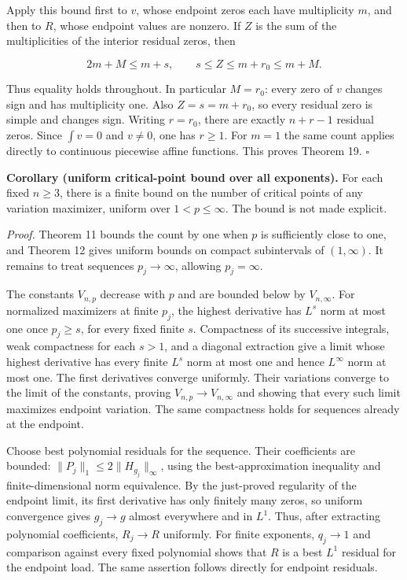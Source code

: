 \documentclass[11pt]{article}
\begin{document}
Apply this bound first to \(v\), whose endpoint zeros each have
multiplicity \(m\), and then to \(R\), whose endpoint values are
nonzero. If \(Z\) is the sum of the multiplicities of the interior
residual zeros, then

\[
2m+M\le m+s,\qquad
s\le Z\le m+r_0\le m+M.
\tag{18.8}
\]

Thus equality holds throughout. In particular \(M=r_0\): every zero of
\(v\) changes sign and has multiplicity one. Also \(Z=s=m+r_0\), so
every residual zero is simple and changes sign. Writing \(r=r_0\), there
are exactly \(n+r-1\) residual zeros. Since \(\int v=0\) and \(v\ne0\),
one has \(r\ge1\). For \(m=1\) the same count applies directly to
continuous piecewise affine functions. This proves Theorem 19.
\(\square\)

\textbf{Corollary (uniform critical-point bound over all exponents).}
For each fixed \(n\ge3\), there is a finite bound on the number of
critical points of any variation maximizer, uniform over
\(1<p\le\infty\). The bound is not made explicit.

\emph{Proof.} Theorem 11 bounds the count by one when \(p\) is
sufficiently close to one, and Theorem 12 gives uniform bounds on
compact subintervals of \((1,\infty)\). It remains to treat sequences
\(p_j\to\infty\), allowing \(p_j=\infty\).

The constants \(V_{n,p}\) decrease with \(p\) and are bounded below by
\(V_{n,\infty}\). For normalized maximizers at finite \(p_j\), the
highest derivative has \(L^s\) norm at most one once \(p_j\ge s\), for
every fixed finite \(s\). Compactness of its successive integrals, weak
compactness for each \(s>1\), and a diagonal extraction give a limit
whose highest derivative has every finite \(L^s\) norm at most one and
hence \(L^\infty\) norm at most one. The first derivatives converge
uniformly. Their variations converge to the limit of the constants,
proving \(V_{n,p}\to V_{n,\infty}\) and showing that every such limit
maximizes endpoint variation. The same compactness holds for sequences
already at the endpoint.

Choose best polynomial residuals for the sequence. Their coefficients
are bounded: \(\|P_j\|_1\le2\|H_{g_j}\|_\infty\), using the
best-approximation inequality and finite-dimensional norm equivalence.
By the just-proved regularity of the endpoint limit, its first
derivative has only finitely many zeros, so uniform convergence gives
\(g_j\to g\) almost everywhere and in \(L^1\). Thus, after extracting
polynomial coefficients, \(R_j\to R\) uniformly. For finite exponents,
\(q_j\to1\) and comparison against every fixed polynomial shows that
\(R\) is a best \(L^1\) residual for the endpoint load. The same
assertion follows directly for endpoint residuals.
\end{document}

